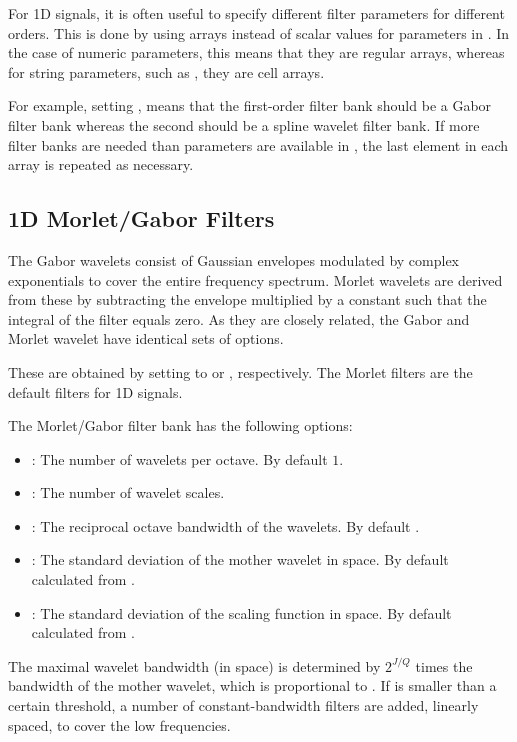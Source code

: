 \documentclass[twocolumn]{article}
\begin{document}
For 1D signals, it is often useful to specify different filter parameters for different orders. This is done by using arrays instead of scalar values for parameters in . In the case of numeric parameters, this means that they are regular arrays, whereas for string parameters, such as , they are cell arrays.

For example, setting , means that the first-order filter bank should be a Gabor filter bank whereas the second should be a spline wavelet filter bank. If more filter banks are needed than parameters are available in , the last element in each array is repeated as necessary.

\subsection{1D Morlet/Gabor Filters}
The Gabor wavelets consist of Gaussian envelopes modulated by complex exponentials to cover the entire frequency spectrum. Morlet wavelets are derived from these by subtracting the envelope multiplied by a constant such that the integral of the filter equals zero. As they are closely related, the Gabor and Morlet wavelet have identical sets of options.

These are obtained by setting  to  or , respectively. The Morlet filters are the default filters for 1D signals. 

The Morlet/Gabor filter bank has the following options:
\begin{itemize}
	\item {}: The number of wavelets per octave. By default $1$.
	\item {}: The number of wavelet scales.
	\item {}: The reciprocal octave bandwidth of the wavelets. By default .
	\item {}: The standard deviation of the mother wavelet in space. By default calculated from .
	\item {}: The standard deviation of the scaling function in space. By default calculated from .
\end{itemize}
The maximal wavelet bandwidth (in space) is determined by $2^{J/Q}$ times the bandwidth of the mother wavelet, which is proportional to . If  is smaller than a certain threshold, a number of constant-bandwidth filters are added, linearly spaced, to cover the low frequencies.
\end{document}
